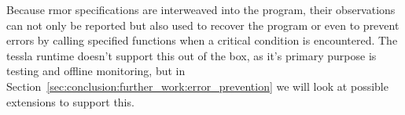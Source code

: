 Because \gls{rmor} specifications are interweaved into the program, their observations can not only be reported but also used to recover the program or even to prevent errors by calling specified functions when a critical condition is encountered.
The \gls{tessla} runtime doesn't support this out of the box, as it's primary purpose is testing and offline monitoring, but in Section~\ref{sec:conclusion:further_work:error_prevention} we will look at possible extensions to support this.


